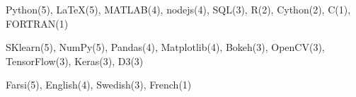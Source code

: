 
  \begin{cvitems}
    \vspace{.5\baselineskip}


   \item \small{Python(5), \LaTeX(5), MATLAB(4), nodejs(4), SQL(3), R(2), Cython(2), C(1), FORTRAN(1)}
   \item \small{SKlearn(5), NumPy(5), Pandas(4), Matplotlib(4), Bokeh(3), OpenCV(3), TensorFlow(3), Keras(3), D3(3)}
   \item \small{Farsi(5), English(4), Swedish(3), French(1)}

  \end{cvitems}

